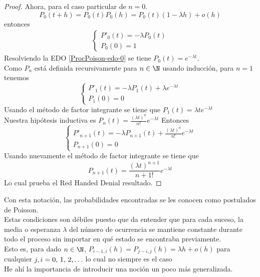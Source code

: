 \begin{proof}
        Ahora, para el caso particular de $n=0$.\\
        $$P_0(t+h)=P_0(t)P_0(h)=P_0(t)(1-\lambda h)+o(h)$$
        entonces
        \begin{eqnarray}
            \begin{cases}
                P'_0(t)=-\lambda P_0(t)\\
                P_0(0)=1
            \end{cases}
             \label{ProcPoison-edo-0}
        \end{eqnarray}
        Resolviendo la EDO \ref{ProcPoison-edo-0} se tiene $P_0(t)=e^{-\lambda t}$.\\
        Como $P_n$ está definida recursivamente para $n\in\N$ usando inducción,
        para $n=1$ tenemos 
        $$\begin{cases}
            P'_1(t)=-\lambda P_1(t)+\lambda e^{-\lambda t}\\
            P_1(0)=0
        \end{cases}$$
        Usando el método de factor integrante se tiene que $P_1(t)=\lambda te^{-\lambda t}$
        \\Nuestra hipótesis inductiva es 
        $P_n(t)=\frac{(\lambda t)^n}{n!}e^{-\lambda t}$
        Entonces 
        $$\begin{cases}
            P'_{n+1}(t)=-\lambda P_{n+1}(t)+\frac{(\lambda t)^n}{n!}e^{-\lambda t}\\
            P_{n+1}(0)=0
        \end{cases}$$
        Usando nuevamente el método de factor integrante se tiene que
        $$P_{n+1}(t)=\frac{(\lambda t)^{n+1}}{n+1!}e^{-\lambda t}$$
        Lo cual prueba el Red Handed Denial resultado.
    \end{proof}
    Con esta notación, las probabilidades encontradas se les conocen como postulados de Poisson.\\
    Estas condiciones son débiles puesto que da entender que para cada suceso, la media o esperanza $\lambda$ del número de ocurrencia se mantiene constante durante todo el proceso sin importar en qué estado se encontraba previamente.\\
    Esto es, para dado $n\in\N$,  $P_{i-1,i}(h)=P_{j-i,j}(h)=\lambda h + o(h)$ para cualquier $j,i=0,\thinspace 1,\thinspace 2 ,\ldots$ lo cual no siempre es el caso
    \\He ahí la importancia de introducir una noción un poco más generalizada.